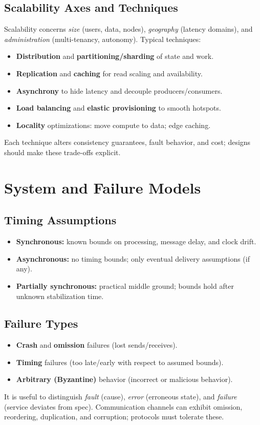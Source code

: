 \subsection{Scalability Axes and Techniques}
Scalability concerns \emph{size} (users, data, nodes), \emph{geography} (latency domains), and \emph{administration} (multi-tenancy, autonomy). Typical techniques:
\begin{itemize}
  \item \textbf{Distribution} and \textbf{partitioning/sharding} of state and work.
  \item \textbf{Replication} and \textbf{caching} for read scaling and availability.
  \item \textbf{Asynchrony} to hide latency and decouple producers/consumers.
  \item \textbf{Load balancing} and \textbf{elastic provisioning} to smooth hotspots.
  \item \textbf{Locality} optimizations: move compute to data; edge caching.
\end{itemize}
Each technique alters consistency guarantees, fault behavior, and cost; designs should make these trade-offs explicit.

\section{System and Failure Models}
\subsection{Timing Assumptions}
\begin{itemize}
  \item \textbf{Synchronous:} known bounds on processing, message delay, and clock drift.
  \item \textbf{Asynchronous:} no timing bounds; only eventual delivery assumptions (if any).
  \item \textbf{Partially synchronous:} practical middle ground; bounds hold after unknown stabilization time.
\end{itemize}

\subsection{Failure Types}
\begin{itemize}
  \item \textbf{Crash} and \textbf{omission} failures (lost sends/receives).
  \item \textbf{Timing} failures (too late/early with respect to assumed bounds).
  \item \textbf{Arbitrary (Byzantine)} behavior (incorrect or malicious behavior).
\end{itemize}
It is useful to distinguish \emph{fault} (cause), \emph{error} (erroneous state), and \emph{failure} (service deviates from spec). Communication channels can exhibit omission, reordering, duplication, and corruption; protocols must tolerate these.

